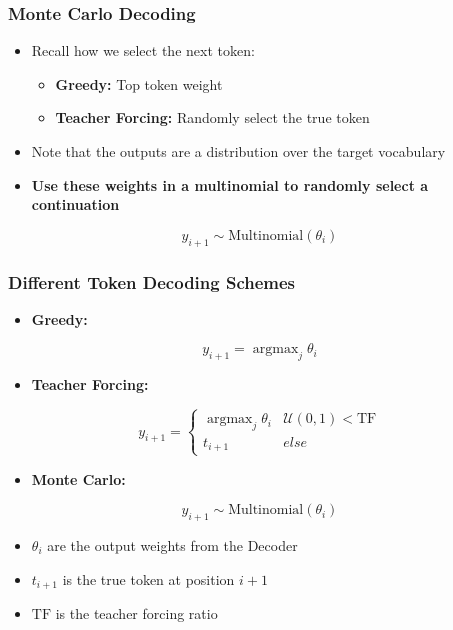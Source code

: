 \documentclass[usenames,dvipsnames]{beamer}
\DeclareMathOperator*{\argmax}{argmax}
\begin{document}
\begin{frame}
  \frametitle{Monte Carlo Decoding}
  \begin{itemize}
    \item Recall how we select the next token:
    \begin{itemize}
      \item \textbf{Greedy:} Top token weight
      \item \textbf{Teacher Forcing:} Randomly select the true token
    \end{itemize}
    \item Note that the outputs are a distribution over the target vocabulary
    \item \textbf{Use these weights in a multinomial to randomly select a continuation}
  \end{itemize}
  \begin{equation*}
      y_{i+1} \sim \text{Multinomial}\left( \theta_i \right)
  \end{equation*}
\end{frame}



\begin{frame}
  \frametitle{Different Token Decoding Schemes}
  \begin{itemize}
    \item \textbf{Greedy:}
  \end{itemize}
  \begin{equation*}
    y_{i+1} = \argmax_j \theta_i
  \end{equation*}
  \begin{itemize}
    \item \textbf{Teacher Forcing:}
  \end{itemize}
  \begin{equation*}
    y_{i+1} = \begin{cases}
      \argmax_{j} \theta_i  & \mathcal{U}(0, 1) < \text{TF} \\
      t_{i+1} & else
    \end{cases}
  \end{equation*}
  \begin{itemize}
    \item \textbf{Monte Carlo:}
  \end{itemize}
  \begin{equation*}
    y_{i+1} \sim \text{Multinomial}\left( \theta_i \right)
  \end{equation*}
  \begin{itemize}
    \item $\theta_i$ are the output weights from the Decoder
    \item $t_{i+1}$ is the true token at position $i + 1$
    \item $\text{TF}$ is the teacher forcing ratio
  \end{itemize}
\end{frame}
\end{document}
